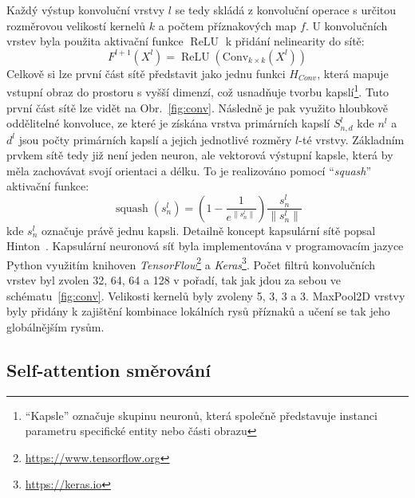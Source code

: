 Každý výstup konvoluční vrstvy $l$ se tedy skládá z konvoluční operace s určitou
rozměrovou velikostí kernelů $k$ a počtem příznakových map $f$. U konvolučních
vrstev byla použita aktivační funkce $\operatorname{ReLU}$ k přidání nelinearity
do sítě:
\begin{equation}
    F^{l+1}\left(X^l\right)=\operatorname{ReLU}\left(\text {Conv}_{k \times k}\left(X^l\right)\right)
\end{equation}
Celkově si lze první část sítě představit jako jednu funkci $H_{Conv}$, která
mapuje vstupní obraz do prostoru s vyšší dimenzí, což usnadňuje tvorbu
kapslí\footnote{\enquote{Kapsle} označuje skupinu neuronů, která společně
představuje instanci parametru specifické entity nebo části obrazu}. Tuto první
část sítě lze vidět na Obr.~\ref{fig:conv}. Následně je pak využito hloubkově
oddělitelné konvoluce, ze které je získána vrstva primárních kapslí $S_{n,d}^l$
kde $n^l$ a $d^l$ jsou počty primárních kapslí a jejich jednotlivé rozměry
$l$-té vrstvy. Základním prvkem sítě tedy již není jeden neuron, ale vektorová
výstupní kapsle, která by měla zachovávat svojí orientaci a délku. To je
realizováno pomocí \enquote{\textit{squash}} aktivační funkce:
\begin{equation}
    \operatorname{squash}\left(s_n^l\right)=\left(1-\frac{1}{e^{\left\|s_n^l\right\|}}\right) \frac{s_n^l}{\left\|s_n^l\right\|}
\end{equation}
kde $s_n^l$ označuje právě jednu kapsli. Detailně koncept kapsulární sítě popsal
Hinton~\cite{Hinton2011}. Kapsulární neuronová síť byla implementována v
programovacím jazyce Python využitím knihoven
\textit{TensorFlow}\footnote{\url{https://www.tensorflow.org}} a
\textit{Keras}\footnote{\url{https://keras.io}}. Počet filtrů konvolučních
vrstev byl zvolen 32, 64, 64 a 128 v pořadí, tak jak jdou za sebou ve
schématu~\ref{fig:conv}. Velikosti kernelů byly zvoleny 5, 3, 3 a 3. MaxPool2D
vrstvy byly přidány k zajištění kombinace lokálních rysů příznaků a učení se tak
jeho globálnějším rysům. 

\subsection{Self-attention směrování}
\label{subsec:dynamicke_smerovani}

